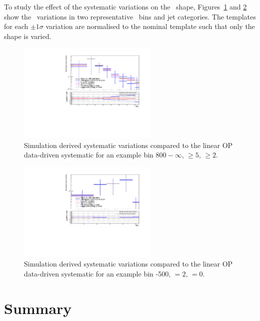 To study the effect of the systematic variations on the \mht~shape, 
Figures~\ref{fig:mcCompLow} and \ref{fig:mcCompHigh} show the \mht~variations in two representative \scalht~bins 
and jet categories. The templates for each $\pm 1 \sigma$ variation are normalised to the
nominal template such that only the shape is varied.

\begin{figure}[h!]
  \centering
  \includegraphics[width=0.6\textwidth]{Figures/backgroundPrediction/mcComparison6fb/totalSMS-T1tttt_mGluino-1000_mLSP-100_25ns_mht_ge5j_ge3b_800.pdf}
  \caption{\label{fig:mcCompLow} Simulation derived systematic variations compared to the linear OP
  data-driven systematic for an example bin \scalht $800-\infty$, \njet $\geq 5$, \nb $\geq 2$.}
\end{figure}
\begin{figure}[h!]
  \centering
  \includegraphics[width=0.6\textwidth]{Figures/backgroundPrediction/mcComparison6fb/totalSMS-T1tttt_mGluino-1000_mLSP-100_25ns_mht_eq2j_eq0b_400.pdf}
  \caption{\label{fig:mcCompHigh} Simulation derived systematic variations compared to the 
linear OP data-driven systematic for an example bin -500, \njet $= 2$, \nb $= 0$.}
\end{figure}

\section{Summary}

